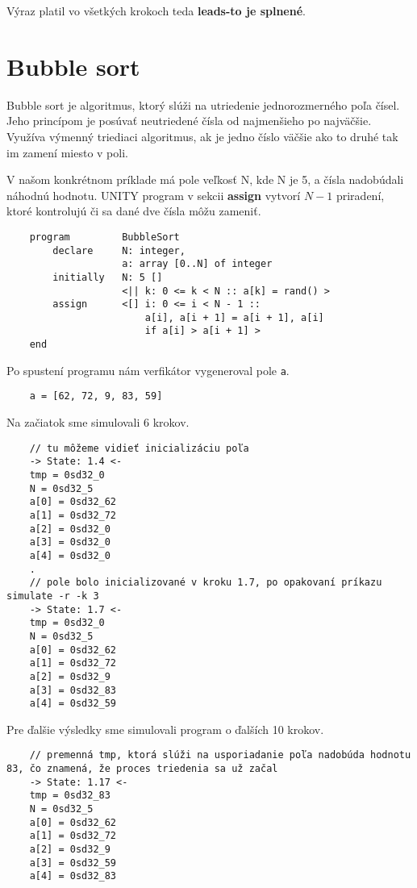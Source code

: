 Výraz platil vo všetkých krokoch teda \textbf{leads-to je splnené}.


\section{Bubble sort}
Bubble sort je algoritmus, ktorý slúži na utriedenie jednorozmerného poľa čísel. Jeho princípom je posúvať
neutriedené čísla od najmenšieho po najväčšie. Využíva výmenný triediaci algoritmus, ak je
jedno číslo väčšie ako to druhé tak im zamení miesto v poli. 

V našom konkrétnom príklade má pole veľkosť N, kde N je 5, a čísla nadobúdali náhodnú hodnotu. 
UNITY program v sekcii \textbf{assign} vytvorí $N-1$ priradení, ktoré kontrolujú či sa dané 
dve čísla môžu zameniť.

\begin{lstlisting}
    program         BubbleSort
        declare     N: integer, 
                    a: array [0..N] of integer
        initially   N: 5 []
                    <|| k: 0 <= k < N :: a[k] = rand() >
        assign      <[] i: 0 <= i < N - 1 :: 
                        a[i], a[i + 1] = a[i + 1], a[i] 
                        if a[i] > a[i + 1] >
    end
\end{lstlisting}

Po spustení programu nám verfikátor vygeneroval pole \texttt{a}. 

\begin{lstlisting}
    a = [62, 72, 9, 83, 59]
\end{lstlisting}

Na začiatok sme simulovali 6 krokov.

\begin{lstlisting}
    // tu môžeme vidieť inicializáciu poľa
    -> State: 1.4 <-
    tmp = 0sd32_0
    N = 0sd32_5
    a[0] = 0sd32_62
    a[1] = 0sd32_72
    a[2] = 0sd32_0
    a[3] = 0sd32_0
    a[4] = 0sd32_0
    .
    // pole bolo inicializované v kroku 1.7, po opakovaní príkazu simulate -r -k 3
    -> State: 1.7 <-
    tmp = 0sd32_0
    N = 0sd32_5
    a[0] = 0sd32_62
    a[1] = 0sd32_72
    a[2] = 0sd32_9
    a[3] = 0sd32_83
    a[4] = 0sd32_59
\end{lstlisting}

Pre ďalšie výsledky sme simulovali program o ďalších 10 krokov.
\begin{lstlisting}
    // premenná tmp, ktorá slúži na usporiadanie poľa nadobúda hodnotu 83, čo znamená, že proces triedenia sa už začal
    -> State: 1.17 <-
    tmp = 0sd32_83
    N = 0sd32_5
    a[0] = 0sd32_62
    a[1] = 0sd32_72
    a[2] = 0sd32_9
    a[3] = 0sd32_59
    a[4] = 0sd32_83
\end{lstlisting}

